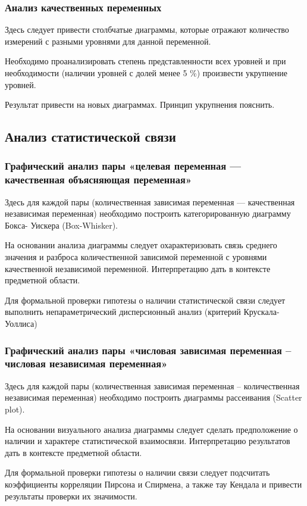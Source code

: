 \documentclass[12pt]{article}
\begin{document}
\subsubsection{Анализ качественных переменных}
Здесь следует привести столбчатые диаграммы, которые отражают количество измерений с разными уровнями для данной переменной.

Необходимо проанализировать степень представленности всех уровней и при
необходимости (наличии уровней с долей менее 5 \%) произвести укрупнение уровней.

Результат привести на новых диаграммах. Принцип укрупнения пояснить.

\subsection{Анализ статистической связи}
\subsubsection{Графический анализ пары «целевая переменная  --- качественная объясняющая переменная»}
Здесь для каждой пары (количественная зависимая переменная --- качественная
независимая переменная) необходимо построить категорированную диаграмму Бокса-
Уискера (Box-Whisker).

На основании анализа диаграммы следует охарактеризовать связь среднего
значения и разброса количественной зависимой переменной с уровнями качественной
независимой переменной. Интерпретацию дать в контексте предметной области.

Для формальной проверки гипотезы о наличии статистической связи следует
выполнить непараметрический дисперсионный анализ (критерий Крускала-Уоллиса)

\subsubsection{Графический анализ пары «числовая зависимая переменная – числовая
независимая переменная»}
Здесь для каждой пары (количественная зависимая переменная – количественная
независимая переменная) необходимо построить диаграммы рассеивания (Scatter plot).

На основании визуального анализа диаграммы следует сделать предположение о
наличии и характере статистической взаимосвязи. Интерпретацию результатов дать в
контексте предметной области.

Для формальной проверки гипотезы о наличии связи следует подсчитать
коэффициенты корреляции Пирсона и Спирмена, а также тау Кендала и привести
результаты проверки их значимости.
\end{document}
